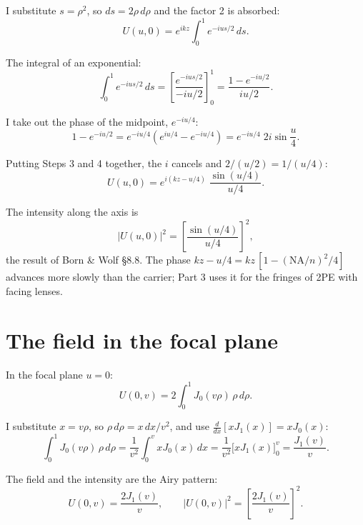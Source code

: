 \documentclass[11pt]{article}
\begin{document}
 I substitute $s = \rho^2$, so $ds = 2\rho\,d\rho$ and the factor 2 is absorbed:
\begin{equation}U(u,0) = e^{ikz}\int_0^1 e^{-ius/2}\,ds .\end{equation}

 The integral of an exponential:
\begin{equation}\int_0^1 e^{-ius/2}\,ds = \left[\frac{e^{-ius/2}}{-iu/2}\right]_0^1
= \frac{1 - e^{-iu/2}}{iu/2} .\end{equation}

 I take out the phase of the midpoint, $e^{-iu/4}$:
\begin{equation}1 - e^{-iu/2} = e^{-iu/4}\left(e^{iu/4} - e^{-iu/4}\right) = e^{-iu/4}\;2i\sin\frac u4 .\end{equation}

 Putting Steps 3 and 4 together, the $i$ cancels and $2/(u/2) = 1/(u/4)$:
\begin{equation}U(u,0) = e^{i(kz - u/4)}\;\frac{\sin(u/4)}{u/4} .\label{eq:axis}\end{equation}

 The intensity along the axis is
\begin{equation}|U(u,0)|^2 = \left[\frac{\sin(u/4)}{u/4}\right]^2 ,\end{equation}
the result of Born \& Wolf §8.8. The phase $kz - u/4 = kz\,[1 - (\mathrm{NA}/n)^2/4]$ advances more slowly than the
carrier; Part 3 uses it for the fringes of 2PE with facing lenses.

\section{The field in the focal plane}
 In the focal plane $u = 0$:
\begin{equation}U(0,v) = 2\int_0^1 J_0(v\rho)\,\rho\,d\rho .\end{equation}

 I substitute $x = v\rho$, so $\rho\,d\rho = x\,dx/v^2$, and use $\frac{d}{dx}[xJ_1(x)] = xJ_0(x)$:
\begin{equation}\int_0^1 J_0(v\rho)\,\rho\,d\rho = \frac{1}{v^2}\int_0^v xJ_0(x)\,dx
= \frac{1}{v^2}\Big[xJ_1(x)\Big]_0^v = \frac{J_1(v)}{v} .\end{equation}

 The field and the intensity are the Airy pattern:
\begin{equation}U(0,v) = \frac{2J_1(v)}{v},\qquad |U(0,v)|^2 = \left[\frac{2J_1(v)}{v}\right]^2 .\end{equation}
\end{document}
